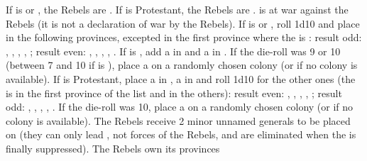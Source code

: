 \begin{digressions}

  \phevnt
  \aparag If \FRA is \CATHCR or \CATHCO, the Rebels are \hug.  If \FRA is
  Protestant, the Rebels are \lig. \FRA is at war against the Rebels (it is
  not a declaration of war by the Rebels).
  \aparag If \FRA is \CATHCR or \CATHCO, roll 1d10 and place \REVOLT
  \facemoins in the following provinces, excepted in the first province where
  the \REVOLT is \faceplus:
  \bparag result odd: \provincePoitou, \provinceQuercy, \provinceGuyenne,
  \provinceLanguedoc, \provinceAuvergne;
  \bparag result even: \provinceCaux, \provincePoitou, \provinceGuyenne,
  \provinceTouraine, \provinceVendee.
  \aparag If \FRA is \CATHCR, add a \REVOLT \faceplus in \provinceDauphine and
  a \REVOLT \facemoins in \provinceArmor.
  \aparag If the die-roll was 9 or 10 (between 7 and 10 if \FRA is \CATHCR),
  place a \REVOLT \facemoins on a randomly chosen colony (or \TP if no colony
  is available).
  \aparag If \FRA is Protestant, place a \REVOLT \faceplus in
  , a \REVOLT \facemoins in \provinceLyonnais and roll
  1d10 for the other ones (the \REVOLT is \faceplus in the first province of
  the list and \facemoins in the others):
  \bparag result even: \provinceProvence, \provinceNormandie, \provinceMaine,
  \provinceTroyes, \provinceVendee;
  \bparag result odd: \provinceOrleanais, \provinceChampagne,
  \provinceTouraine, \provinceCaux, \provincePicardie.
  \aparag If the die-roll was 10, place a \REVOLT \facemoins on a randomly
  chosen colony (or \TP if no colony is available).
  \aparag The Rebels receive 2 minor unnamed generals to be placed on \REVOLT
  (they can only lead \REVOLT , not forces of the Rebels, and are eliminated
  when the \REVOLT is finally suppressed).
  \aparag The Rebels own its provinces %




\end{digressions}
